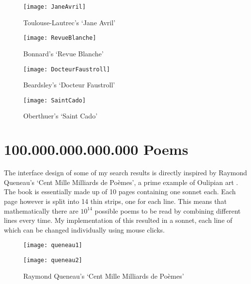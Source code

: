 \begin{figure}
\centering
\begin{minipage}{.45\linewidth}
  \texttt{[image: JaneAvril]}
  \caption[Toulouse-Lautrec's `Jane Avril']{Toulouse-Lautrec's `Jane Avril'}
\label{fig:toulouse}
\end{minipage}
\hspace{.05\linewidth}
\begin{minipage}{.45\linewidth}
  \texttt{[image: RevueBlanche]}
  \caption[Bonnard's `Revue Blanche']{Bonnard's `Revue Blanche'}
\label{fig:bonnard}
\end{minipage}
\vspace{.05\linewidth}
\begin{minipage}{.45\linewidth}
  \texttt{[image: DocteurFaustroll]}
  \caption[Beardsley's `Docteur Faustroll']{Beardsley's `Docteur Faustroll'}
\label{fig:beardsley}
\end{minipage}
\hspace{.05\linewidth}
\begin{minipage}{.45\linewidth}
  \texttt{[image: SaintCado]}
  \caption[Oberthuer's `Saint Cado']{Oberthuer's `Saint Cado'}
\label{fig:oberthuer}
\end{minipage}
\end{figure}


\section{100.000.000.000.000 Poems}

The interface design of some of my search results is directly inspired by
Raymond Queneau's `Cent Mille Milliards de Poèmes', a prime example of Oulipian art \autocite{Queneau1961}. The book is essentially made up of 10 pages containing one sonnet each. Each page however is split into 14 thin strips, one for each line. This means that mathematically there are $10^{14}$ possible poems to be read by combining different lines every time. My implementation of this resulted in a sonnet, each line of which can be changed individually using mouse clicks.

\begin{figure}[h!]
\centering
\begin{minipage}{.45\linewidth}
  \texttt{[image: queneau1]}
\end{minipage}
\hspace{.05\linewidth}
\begin{minipage}{.45\linewidth}
  \texttt{[image: queneau2]}
\end{minipage}
\caption[Queneau's `Cent Mille Milliards de Poèmes']{Raymond Queneau's `Cent Mille Milliards de Poèmes'\footnotemark}
\label{fig:queneau12}
\end{figure}


